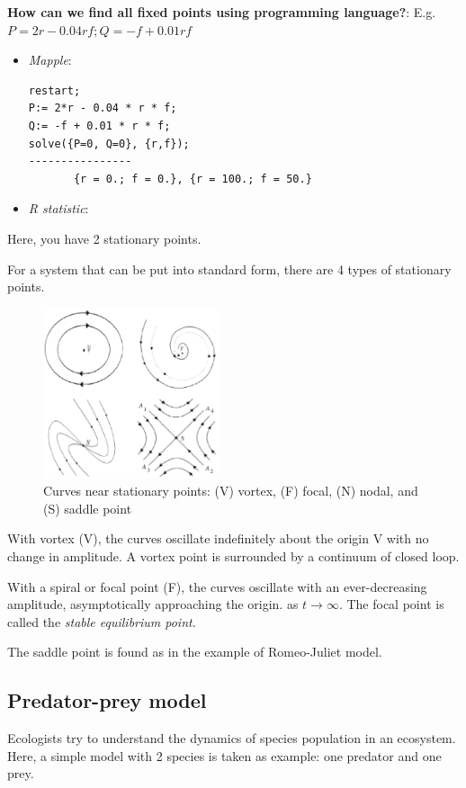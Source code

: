 {\bf How can we find all fixed points using programming language?}:
E.g. $P=2r - 0.04rf; Q = -f + 0.01rf$
\begin{itemize}
\item {\it Mapple}:
\begin{verbatim}
restart;
P:= 2*r - 0.04 * r * f;
Q:= -f + 0.01 * r * f;
solve({P=0, Q=0}, {r,f});
----------------
       {r = 0.; f = 0.}, {r = 100.; f = 50.}
\end{verbatim}

\item {\it R statistic}:

\end{itemize}
Here, you have 2 stationary points. 

For a system that can be put into standard form, there are 4 types of
stationary points. 

\begin{figure}[htb]
  \centerline{\includegraphics[height=5cm]{./images/stationary_points.eps}}
  \caption{Curves near stationary points: (V) vortex, (F) focal, (N)
    nodal, and (S) saddle point}\label{fig:stationary_points}
\end{figure}
With vortex (V), the curves oscillate indefinitely about the origin V
with no change in amplitude. A vortex point is surrounded by a
continuum of closed loop. 

With a spiral or focal point (F), the curves oscillate with an ever-decreasing
amplitude, asymptotically approaching the origin. as $t\rightarrow
\infty$. The focal point is called the {\it stable equilibrium
  point}. 

The saddle point is found as in the example of Romeo-Juliet model. 

\subsection{Predator-prey model}
\label{sec:predator-prey-model}
\label{sec:Lotka-Volterra-equation}

Ecologists try to understand the dynamics of species population in an
ecosystem. Here, a simple model with 2 species is taken as example:
one predator and one prey.

